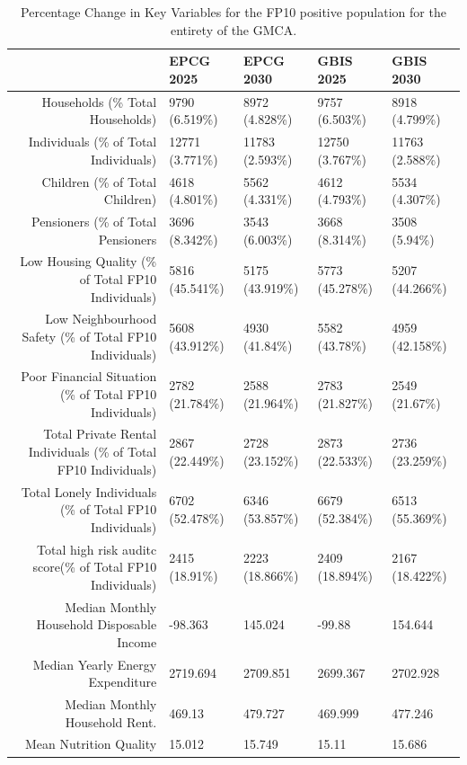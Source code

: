 \begin{table}[ht]
\centering
\begingroup\scriptsize
\begin{tabular}{rllll}
  \hline
 & EPCG 2025 & EPCG 2030 & GBIS 2025 & GBIS 2030 \\ 
  \hline
Households (\% Total Households) & 9790 (6.519\%) & 8972 (4.828\%) & 9757 (6.503\%) & 8918 (4.799\%) \\ 
  Individuals (\% of Total Individuals) & 12771 (3.771\%) & 11783 (2.593\%) & 12750 (3.767\%) & 11763 (2.588\%) \\ 
  Children (\% of Total Children) & 4618 (4.801\%) & 5562 (4.331\%) & 4612 (4.793\%) & 5534 (4.307\%) \\ 
  Pensioners (\% of Total Pensioners & 3696 (8.342\%) & 3543 (6.003\%) & 3668 (8.314\%) & 3508 (5.94\%) \\ 
  Low Housing Quality (\% of Total FP10 Individuals) & 5816 (45.541\%) & 5175 (43.919\%) & 5773 (45.278\%) & 5207 (44.266\%) \\ 
  Low Neighbourhood Safety (\% of Total FP10 Individuals) & 5608 (43.912\%) & 4930 (41.84\%) & 5582 (43.78\%) & 4959 (42.158\%) \\ 
  Poor Financial Situation (\% of Total FP10 Individuals) & 2782 (21.784\%) & 2588 (21.964\%) & 2783 (21.827\%) & 2549 (21.67\%) \\ 
  Total Private Rental Individuals (\% of Total FP10 Individuals) & 2867 (22.449\%) & 2728 (23.152\%) & 2873 (22.533\%) & 2736 (23.259\%) \\ 
  Total Lonely Individuals (\% of Total FP10 Individuals) & 6702 (52.478\%) & 6346 (53.857\%) & 6679 (52.384\%) & 6513 (55.369\%) \\ 
  Total high risk auditc score(\% of Total FP10 Individuals) & 2415 (18.91\%) & 2223 (18.866\%) & 2409 (18.894\%) & 2167 (18.422\%) \\ 
  Median Monthly Household Disposable Income & -98.363 & 145.024 & -99.88 & 154.644 \\ 
  Median Yearly Energy Expenditure & 2719.694 & 2709.851 & 2699.367 & 2702.928 \\ 
  Median Monthly Household Rent. & 469.13 & 479.727 & 469.999 & 477.246 \\ 
  Mean Nutrition Quality & 15.012 & 15.749 & 15.11 & 15.686 \\ 
   \hline
\end{tabular}
\endgroup
\caption{Percentage Change in Key Variables for the FP10 positive population for the entirety of the GMCA.} 
\end{table}
